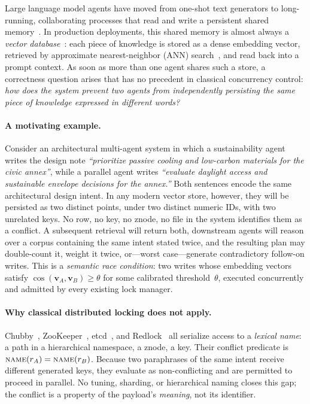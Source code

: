 \documentclass[sigconf]{acmart}
\begin{document}
Large language model agents have moved from one-shot text generators to
long-running, collaborating processes that read and write a persistent shared
memory~\cite{park2023generative,langgraph,autogen}. In production
deployments, this shared memory is almost always a \emph{vector
database}~\cite{qdrant,weaviate,pinecone,pgvector}: each piece of knowledge is
stored as a dense embedding vector, retrieved by approximate
nearest-neighbor (ANN) search~\cite{faiss,hnswlib}, and read back into a
prompt context. As soon as more than one agent shares such a store, a
correctness question arises that has no precedent in classical concurrency
control: \emph{how does the system prevent two agents from independently
persisting the same piece of knowledge expressed in different words?}

\paragraph{\textbf{A motivating example.}}
Consider an architectural multi-agent system in which a sustainability agent
writes the design note \emph{``prioritize passive cooling and low-carbon
materials for the civic annex''}, while a parallel agent writes
\emph{``evaluate daylight access and sustainable envelope decisions for the
annex.''} Both sentences encode the same architectural design intent. In any
modern vector store, however, they will be persisted as two distinct points,
under two distinct numeric IDs, with two unrelated keys. No row, no key, no
znode, no file in the system identifies them as a conflict. A subsequent
retrieval will return both, downstream agents will reason over a corpus
containing the same intent stated twice, and the resulting plan may
double-count it, weight it twice, or---worst case---generate contradictory
follow-on writes. This is a \emph{semantic race condition}: two writes whose
embedding vectors satisfy $\cos(\mathbf{v}_A,\mathbf{v}_B)\ge\theta$ for some
calibrated threshold~$\theta$, executed concurrently and admitted by every
existing lock manager.

\paragraph{\textbf{Why classical distributed locking does not apply.}}
Chubby~\cite{chubby}, ZooKeeper~\cite{zookeeper}, etcd~\cite{etcd}, and
Redlock~\cite{redlock} all serialize access to a \emph{lexical name}: a path
in a hierarchical namespace, a znode, a key. Their conflict predicate is
$\textsc{name}(r_A)=\textsc{name}(r_B)$. Because two paraphrases of the same
intent receive different generated keys, they evaluate as non-conflicting and
are permitted to proceed in parallel. No tuning, sharding, or hierarchical
naming closes this gap; the conflict is a property of the payload's
\emph{meaning}, not its identifier.
\end{document}
